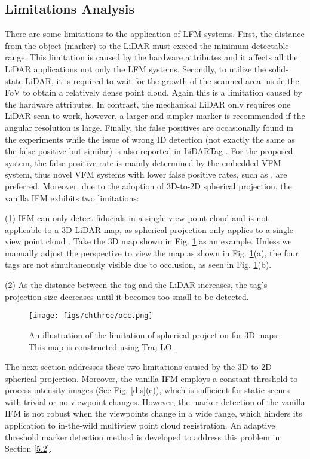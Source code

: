 \subsection{Limitations Analysis} \label{twofourfour}
There are some limitations to the application of LFM systems. First, the distance from the object (marker) to the LiDAR must exceed the minimum detectable range. This limitation is caused by the hardware attributes and it affects all the LiDAR applications not only the LFM systems. Secondly, to utilize the solid-state LiDAR, it is required to wait for the growth of the scanned area inside the FoV to obtain a relatively dense point cloud. Again this is a limitation caused by the hardware attributes. In contrast, the mechanical LiDAR only requires one LiDAR scan to work, however, a larger and simpler marker is recommended if the angular resolution is large.  Finally, the false positives are occasionally found in the experiments while the issue of wrong ID detection (not exactly the same as the false positive but similar) is also reported in LiDARTag \cite{lt}. For the proposed system, the false positive rate is mainly determined by the embedded VFM system, thus novel VFM systems with lower false positive rates, such as \cite{ap3,aruco}, are preferred. Moreover, due to the adoption of 3D-to-2D spherical projection, the vanilla IFM exhibits two limitations:
\par
(1) IFM can only detect fiducials in a single-view point cloud and is not applicable to a 3D LiDAR map, as spherical projection only applies to a single-view point cloud \cite{rangenet}. Take the 3D map shown in Fig. \ref{occ} as an example. Unless we manually adjust the perspective to view the map as shown in Fig. \ref{occ}(a), the four tags are not simultaneously visible due to occlusion, as seen in Fig. \ref{occ}(b).
\par
(2) As the distance between the tag and the LiDAR increases, the tag's projection size decreases until it becomes too small to be detected.
\begin{figure}[t] 
	\centering
\texttt{[image: figs/chthree/occ.png]}
	\caption{An illustration of the limitation of spherical projection for 3D maps. This map is constructed using Traj LO \cite{traj}.}
	\label{occ}
\end{figure} \par
The next section addresses these two limitations caused by the 3D-to-2D spherical projection. Moreover, the vanilla IFM employs a constant threshold to process intensity images (See Fig. \ref{dis}(c)), which is sufficient for static scenes with trivial or no viewpoint changes. However, the marker detection of the vanilla IFM is not robust when the viewpoints change in a wide range, which hinders its application to in-the-wild multiview point cloud registration. An adaptive threshold marker detection method is developed to address this problem in Section \ref{5.2}.

